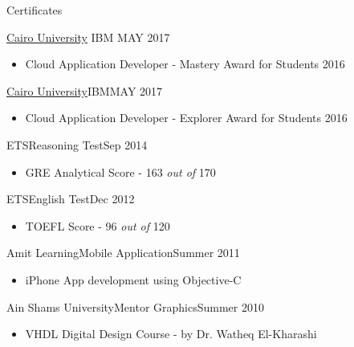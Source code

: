 \documentclass[]{mcdowellcv}
\begin{document}
\begin{cvsection}{Certificates}
\begin{cvsubsection}
			{\href{https://www.youracclaim.com/badges/8db17289-9e32-4ad2-9e28-32bd62c58775/public_url} {Cairo University}}
			{IBM}
			{MAY 2017}
			\begin{itemize}
				\item Cloud Application Developer - Mastery Award for Students 2016
			\end{itemize}
		\end{cvsubsection}
		\begin{cvsubsection}{\href{https://www.youracclaim.com/badges/6bf35fd2-4ce7-463c-a8aa-edf84ac69683/public_url}{Cairo University}}{IBM}{MAY 2017}
			\begin{itemize}
				\item Cloud Application Developer - Explorer Award for Students 2016
			\end{itemize}
		\end{cvsubsection}

		\begin{cvsubsection}{ETS}{Reasoning Test}{Sep 2014}
			\begin{itemize}
				\item GRE Analytical Score - 163 \textit{out of} 170
			\end{itemize}
		\end{cvsubsection}

		\begin{cvsubsection}{ETS}{English Test}{Dec 2012}
			\begin{itemize}
				\item TOEFL Score - 96 \textit{out of} 120
			\end{itemize}
		\end{cvsubsection}

		\begin{cvsubsection}{Amit Learning}{Mobile Application}{Summer 2011}
			\begin{itemize}
				\item iPhone App development using Objective-C
			\end{itemize}
		\end{cvsubsection}

		\begin{cvsubsection}{Ain Shams University}{Mentor Graphics}{Summer 2010}
			\begin{itemize}
				\item VHDL Digital Design Course - by Dr. Watheq El-Kharashi
			\end{itemize}
		\end{cvsubsection}
		
	\end{cvsection}	
	
\end{document}
